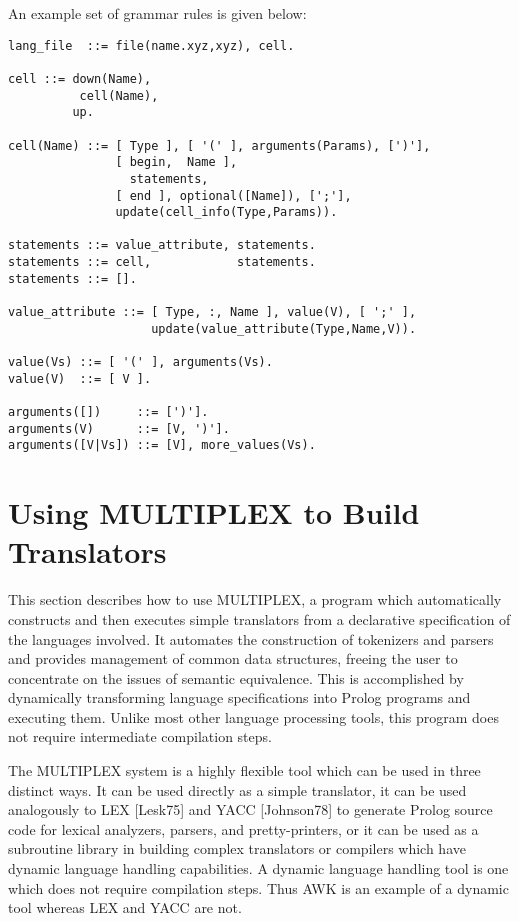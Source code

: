An example set of grammar rules is given below:
\begin{verbatim}
lang_file  ::= file(name.xyz,xyz), cell.

cell ::= down(Name),
          cell(Name),
         up.

cell(Name) ::= [ Type ], [ '(' ], arguments(Params), [')'],
               [ begin,  Name ],
                 statements,
               [ end ], optional([Name]), [';'],
               update(cell_info(Type,Params)).

statements ::= value_attribute, statements.
statements ::= cell,            statements.
statements ::= [].

value_attribute ::= [ Type, :, Name ], value(V), [ ';' ],
                    update(value_attribute(Type,Name,V)).

value(Vs) ::= [ '(' ], arguments(Vs).
value(V)  ::= [ V ].

arguments([])     ::= [')'].
arguments(V)      ::= [V, ')'].
arguments([V|Vs]) ::= [V], more_values(Vs).
\end{verbatim}

\section{Using MULTIPLEX to Build Translators}

This section describes how to use MULTIPLEX,
a program which automatically
constructs and then executes simple translators from
a declarative specification of the languages involved.
It automates the construction of
tokenizers and parsers and provides management
of common data structures, freeing the user to
concentrate on the issues of semantic equivalence.
This is accomplished by dynamically transforming
language specifications into Prolog programs and
executing them. Unlike most other language processing
tools, this program does not require intermediate
compilation steps.

The MULTIPLEX system is a highly flexible tool which
can be used in three distinct ways. It can be used
directly as a simple translator, it can be used
analogously to LEX [Lesk75] and YACC [Johnson78]
to generate Prolog source
code for lexical analyzers, parsers, and pretty-printers,
or it can be used as a subroutine library in building
complex translators or compilers which have
dynamic language handling capabilities. A dynamic
language handling tool is one which does not require
compilation steps.  Thus AWK is an example of a
dynamic tool whereas LEX and YACC are not.

